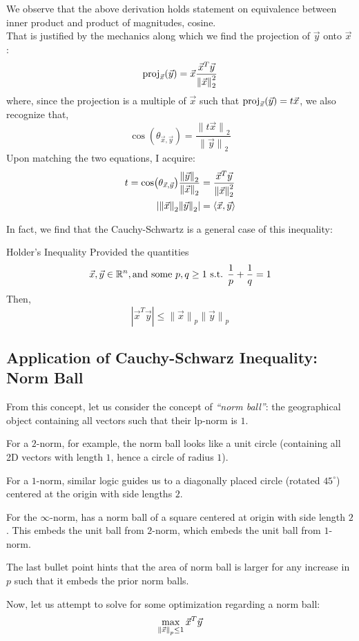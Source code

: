 We observe that the above derivation holds statement on equivalence between inner product and product of magnitudes, cosine. \\
That is justified by the mechanics along which we find the projection of $\vec{y}$ onto $\vec{x}$:
\[
    \proj{\vec{x}}{\vec{y}} = \vec{x} \frac{\vec{x}^T\vec{y}}{{\lVert \vec{x} \rVert}_2^2}
\]
where, since the projection is a multiple of $\vec{x}$ such that $\proj{\vec{x}}{\vec{y}} = t\vec{x}$, we also recognize that,
\[
    \cos(\theta_{\vec{x}, \vec{y}}) = \frac{{\lVert t\vec{x} \rVert}_2}{{\lVert \vec{y} \rVert}_2}
\]
Upon matching the two equations, I acquire:
\begin{align*}
    t = \cos(\theta_{\vec{x}, \vec{y}}) \frac{\pnorm{\vec{y}}{2}}{\pnorm{\vec{x}}{2}} &= \frac{\vec{x}^T\vec{y}}{\pnorm[2]{\vec{x}}{2}} \\
    |{\lVert \vec{x} \rVert}_2 {\lVert \vec{y} \rVert}_2| &= \langle \vec{x}, \vec{y} \rangle
\end{align*}

In fact, we find that the Cauchy-Schwartz is a general case of this inequality:
\begin{ln-define}{Holder's Inequality}{}
    Provided the quantities
    \[\vec{x}, \vec{y} \in \R^n, \text{and some } p, q \geq 1 \text{ s.t. } \frac{1}{p} + \frac{1}{q} = 1\]
    Then, 
    \[|\vec{x}^T \vec{y}| \leq {\lVert \vec{x} \rVert}_p{\lVert \vec{y} \rVert}_p\]
\end{ln-define}

\subsection{Application of Cauchy-Schwarz Inequality: Norm Ball}
From this concept, let us consider the concept of \textit{``norm ball''}: the geographical object containing all vectors such that their lp-norm is $1$.

\begin{bindenum}
    \item For a $2$-norm, for example, the norm ball looks like a unit circle (containing all 2D vectors with length $1$, hence a circle of radius $1$).
    \item For a $1$-norm, similar logic guides us to a diagonally placed circle (rotated $45^\circ$) centered at the origin with side lengths $2$.
    \item For the $\infty$-norm, has a norm ball of a square centered at origin with side length $2$. This embeds the unit ball from $2$-norm, which embeds the unit ball from $1$-norm.
\end{bindenum}
The last bullet point hints that the area of norm ball is larger for any increase in $p$ such that it embeds the prior norm balls.
\par
Now, let us attempt to solve for some optimization regarding a norm ball:
\[\max_{\pnorm{\vec{x}}{p} \leq 1} \vec{x}^T \vec{y}\]

